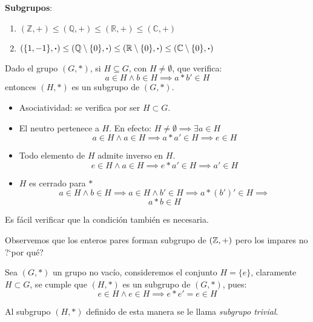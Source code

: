 	\textbf{Subgrupos}:
	\begin{enumerate}
		\item $(\mathbb{Z}, +) \le (\mathbb{Q}, +) \le (\mathbb{R}, +) \le (\mathbb{C}, +)$
		\item $\left( \{1, -1 \}, \boldsymbol{\cdot} \right) \le \left( \mathbb{Q} \setminus \{0\}, \boldsymbol{\cdot} \right) \le \left( \mathbb{R} \setminus \{0\}, \boldsymbol{\cdot} \right) \le \left( \mathbb{C} \setminus \{0\}, \boldsymbol{\cdot} \right)$
	\end{enumerate}
	
	\begin{fmd-theorem} \label{teo:subgrupo}
		Dado el grupo $(G, *)$, si $H \subseteq G$, con $H \ne \emptyset$, que verifica:
		\[ a \in H \land b \in H \implies a * b' \in H\]
		entonces $(H, *)$ es un subgrupo de $(G, *)$.
	\end{fmd-theorem}

	\begin{fmd-proof}
		\begin{itemize}
			\item Asociatividad: se verifica por ser $H \subset G$.
			\item El neutro pertenece a $H$. En efecto: $H \ne \emptyset \implies \exists a \in H$
			\vspace{-3mm}
			\[a \in H \land a \in H \implies a*a'\in H \implies e \in H\]
			\item Todo elemento de $H$ admite inverso en $H$.
			\vspace{-3mm}
			\[ e \in H \land a \in H \implies e * a' \in H \implies a'\in H \]
			\item $H$ es cerrado para $*$
			\vspace{-3mm}
			\[ a \in H \land b \in H \implies a \in H \land b' \in H \implies a*(b')' \in H \implies \]
			\[ a*b \in H\]
		\end{itemize}
	\end{fmd-proof}
	Es fácil verificar que la condición también es necesaria.
	
Observemos que los enteros pares forman subgrupo de $(\mathbb{Z}, +)$ pero los impares no ?`por qué?

\begin{definition} 
	Sea $(G, *)$ un grupo no vacío, consideremos el conjunto $H = \{ e \}$, claramente $H \subset G$, se cumple que $(H, *)$ es un subgrupo de $(G, *)$, pues:
	\[ e \in H \land e \in H \implies e * e' = e \in H \]
	
	Al subgrupo $(H, *)$ definido de esta manera se le llama \textit{subgrupo trivial}.
\end{definition}

